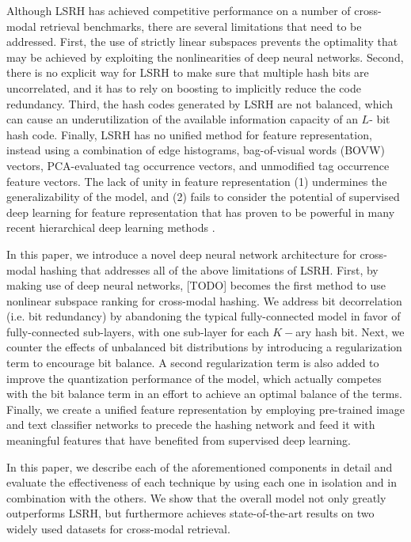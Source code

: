 \documentclass[letterpaper]{article}
\begin{document}
Although LSRH has achieved competitive performance on a number of cross-modal retrieval benchmarks, there are several limitations that need to be addressed. First, the use of strictly linear subspaces prevents the optimality that may be achieved by exploiting the nonlinearities of deep neural networks. Second, there is no explicit way for LSRH to make sure that multiple hash bits are uncorrelated, and it has to rely on boosting to implicitly reduce the code redundancy. Third, the hash codes generated by LSRH are not balanced, which can cause an underutilization of the available information capacity of an $L$- bit hash code. Finally, LSRH has no unified method for feature representation, instead using a combination of edge histograms, bag-of-visual words (BOVW) vectors, PCA-evaluated tag occurrence vectors, and unmodified tag occurrence feature vectors. The lack of unity in feature representation (1) undermines the generalizability of the model, and (2) fails to consider the potential of supervised deep learning for feature representation that has proven to be powerful in many recent hierarchical deep learning methods \cite{dvsh,dcmh,autoen,chn,cdq}.

In this paper, we introduce a novel deep neural network architecture for cross-modal hashing that addresses all of the above limitations of LSRH. First, by making use of deep neural networks, [TODO] becomes the first method to use nonlinear subspace ranking for cross-modal hashing. We address bit decorrelation (i.e. bit redundancy) by abandoning the typical fully-connected model in favor of fully-connected sub-layers, with one sub-layer for each $K-$ary hash bit. Next, we counter the effects of unbalanced bit distributions by introducing a regularization term to encourage bit balance. A second regularization term is also added to improve the quantization performance of the model, which actually competes with the bit balance term in an effort to achieve an optimal balance of the terms. Finally, we create a unified feature representation by employing pre-trained image and text classifier networks to precede the hashing network and feed it with meaningful features that have benefited from supervised deep learning.

In this paper, we describe each of the aforementioned components in detail and evaluate the effectiveness of each technique by using each one in isolation and in combination with the others. We show that the overall model not only greatly outperforms LSRH, but furthermore achieves state-of-the-art results on two widely used datasets for cross-modal retrieval.
\end{document}
